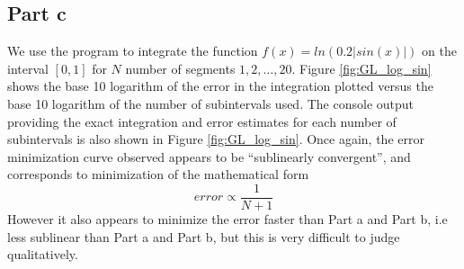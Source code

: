 \documentclass[11pt]{article}
\begin{document}
\FloatBarrier
\subsection*{Part c}
We use the program to integrate the function $f(x) = ln(0.2 |sin(x)|)$ on the interval $[0, 1]$ for $N$ number of segments $1, 2, \ldots , 20$. Figure \ref{fig:GL_log_sin} shows the base 10 logarithm of the error in the integration plotted versus the base 10 logarithm of the number of subintervals used. The console output providing the exact integration and error estimates for each number of subintervals is also shown in Figure \ref{fig:GL_log_sin}. Once again, the error minimization curve observed appears to be ``sublinearly convergent'', and corresponds to minimization of the mathematical form
$$ error \propto \frac{1}{N + 1} $$
However it also appears to minimize the error faster than Part a and Part b, i.e less sublinear than Part a and Part b, but this is very difficult to judge qualitatively.
\end{document}
